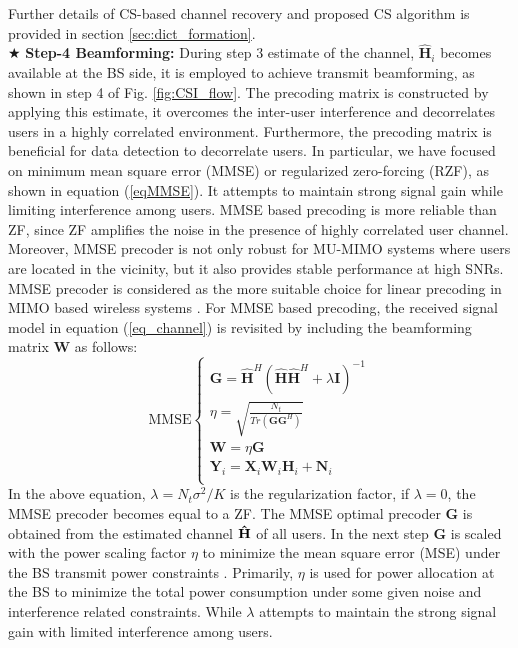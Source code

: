 Further details of CS-based channel recovery and proposed CS algorithm is provided in section \ref{sec:dict_formation}. \\

$\bigstar$ \textbf{Step-4 Beamforming:}
During step 3 estimate of the channel, $\mathbf{\hat{H}}_i$  becomes available at the BS side, it is employed to achieve transmit beamforming, as shown in step 4 of Fig. \ref{fig:CSI_flow}. The precoding matrix is constructed by applying this estimate, it overcomes the inter-user interference and decorrelates users in a highly correlated environment. Furthermore, the precoding matrix is beneficial for data detection to decorrelate users. In particular, we have focused on minimum mean square error (MMSE) or regularized zero-forcing (RZF), as shown in equation (\ref{eqMMSE}). It attempts to maintain strong signal gain while limiting interference among users.  MMSE based precoding is more reliable than ZF, since ZF amplifies the noise in the presence of highly correlated user channel. Moreover, MMSE precoder is not only robust for MU-MIMO systems where users are located in the vicinity, but it also provides stable performance at high SNRs\cite{precding_survay}.  MMSE precoder is considered as the more suitable choice for linear precoding in MIMO based wireless systems \cite{precding_survay,precoding_emil}. For MMSE based precoding, the received signal model in equation (\ref{eq_channel}) is revisited  by including the beamforming matrix $\mathbf{W}$  as follows: 
\begin{equation}
\text{MMSE}
\begin{cases}
\mathbf{G}= \mathbf{\hat{H}}^H (\mathbf{\hat{H}} \mathbf{\hat{H}}^H +\lambda \mathbf{I} )^{-1 } \\
\eta= \sqrt{\frac{N_t}{Tr (\mathbf{G} \mathbf{ G}^H)}}\\
\mathbf{W}= \eta \mathbf{G} \\
\mathbf{Y}_i=\mathbf{X}_i \mathbf{W}_i \mathbf{H}_i +\mathbf{N}_i\\
\end{cases}
\label{eqMMSE}
\end{equation}
 In the above equation, $\lambda= N_t \sigma^2 /K$ is the regularization factor, if $\lambda=0$, the MMSE precoder becomes equal to a ZF. The MMSE optimal precoder $\mathbf{G}$ is obtained from the estimated channel $\mathbf{\Hat{H}}$ of all users.
In the next step $\mathbf{G}$ is scaled with the power scaling factor $\eta$ to minimize the mean square error (MSE) under the  BS transmit power constraints \cite{power_MMSE}. Primarily, $\eta $ is used for power allocation at the BS to minimize the total power consumption under some given noise and interference related constraints. While $\lambda$ attempts to maintain the strong signal gain with limited interference among users.
